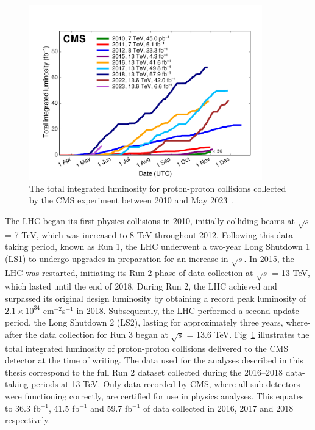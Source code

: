 \begin{figure}[h]
    \centering
    \includegraphics[width=0.9\textwidth]{Figures/int_lumi_cumulative_pp_2.pdf}
    \caption{The total integrated luminosity for proton-proton collisions collected by the CMS experiment between 2010 and May 2023~\cite{}.}
    \label{fig:int_lumi}
\end{figure}

The LHC began its first physics collisions in 2010, initially colliding beams at $\sqrt{s}$ = 7 TeV, which was increased to 8 TeV throughout 2012. 
Following this data-taking period, known as Run 1, the LHC underwent a two-year Long Shutdown 1 (LS1) to undergo upgrades in preparation for an increase in $\sqrt{s}$. 
In 2015, the LHC was restarted, initiating its Run 2 phase of data collection at $\sqrt{s}$ = 13 TeV, which lasted until the end of 2018. 
During Run 2, the LHC achieved and surpassed its original design luminosity by obtaining a record peak luminosity of $2.1\times10^{34}$ cm$^{−2}$s$^{−1}$ in 2018.
Subsequently, the LHC performed a second update period, the Long Shutdown 2 (LS2), lasting for approximately three years, where-after the data collection for Run 3 began at $\sqrt{s}$ = 13.6 TeV.
Fig~\ref{fig:int_lumi} illustrates the total integrated luminosity of proton-proton collisions delivered to the CMS detector at the time of writing.
The data used for the analyses described in this thesis correspond to the full Run 2 dataset collected during the 2016--2018 data-taking periods at 13 TeV. 
Only data recorded by CMS, where all sub-detectors were functioning correctly, are certified for use in physics analyses. 
This equates to 36.3 fb$^{−1}$, 41.5 fb$^{−1}$ and 59.7 fb$^{-1}$ of data collected in 2016, 2017 and 2018 respectively. \\

